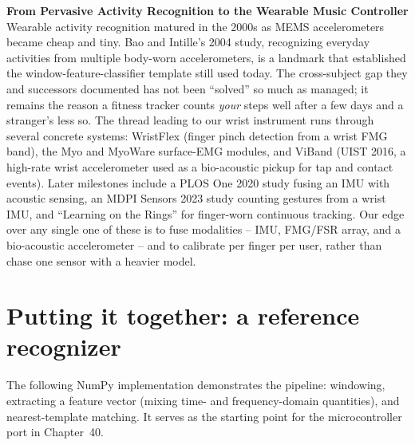 \begin{applicationbox}
\textbf{From Pervasive Activity Recognition to the Wearable Music Controller}
Wearable activity recognition matured in the 2000s as MEMS accelerometers became
cheap and tiny. Bao and Intille's 2004 study, recognizing everyday activities from
multiple body-worn accelerometers, is a landmark that established the
window-feature-classifier template still used today. The cross-subject gap
they and successors documented has not been ``solved'' so much as managed; it
remains the reason a fitness tracker counts \emph{your} steps well after a few days
and a stranger's less so. The thread leading to our wrist instrument runs
through several concrete systems: WristFlex (finger pinch detection from a wrist FMG band),
the Myo and MyoWare surface-EMG modules, and ViBand (UIST 2016, a high-rate
wrist accelerometer used as a bio-acoustic pickup for tap and contact events). Later milestones include a
PLOS One 2020 study fusing an IMU with acoustic sensing, an MDPI Sensors 2023 study
counting gestures from a wrist IMU, and ``Learning on the Rings'' for finger-worn
continuous tracking. Our edge over any single one of these is to fuse modalities --
IMU, FMG/FSR array, and a bio-acoustic accelerometer -- and to calibrate per finger
per user, rather than chase one sensor with a heavier model.
\end{applicationbox}

\section{Putting it together: a reference recognizer}
\label{ch38:reference}

The following NumPy implementation demonstrates the pipeline: windowing, extracting a feature vector (mixing time- and frequency-domain quantities), and nearest-template matching. It serves as the starting point for the microcontroller port in Chapter~40.

